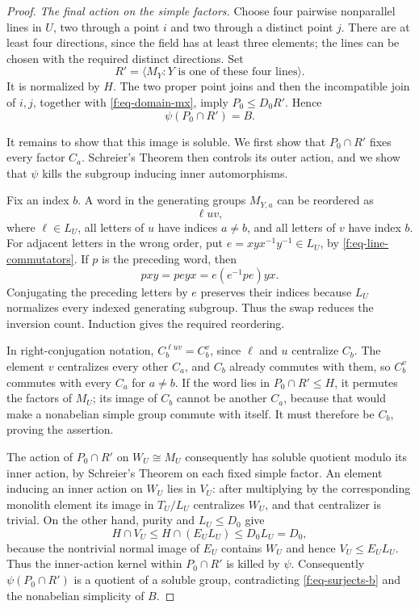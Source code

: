 \begin{proof}
\emph{The final action on the simple factors.}
Choose four pairwise nonparallel lines in $U$, two through a point $i$ and
two through a distinct point $j$. There are at least four directions,
since the field has at least three elements; the lines can be chosen
with the required distinct directions. Set
\[
 R'=\langle M_Y:Y\text{ is one of these four lines}\rangle.
\]
It is normalized by $H$. The two proper point joins and then the
incompatible join of $i,j$, together with \eqref{f:eq-domain-mx}, imply
$P_0\le D_0R'$. Hence
\begin{equation}\label{f:eq-surjects-b}
 \psi(P_0\cap R')=B.
\end{equation}

It remains to show that this image is soluble. We first show that
$P_0\cap R'$ fixes every factor $C_a$. Schreier's Theorem then controls
its outer action, and we show that $\psi$ kills the subgroup inducing
inner automorphisms.

Fix an index $b$.
A word in the generating groups $M_{Y,a}$ can be reordered as
\[
 \ell u v,
\]
where $\ell\in L_U$, all letters of $u$ have indices $a\ne b$, and all
letters of $v$ have index $b$. For adjacent letters in the wrong order,
put $e=xyx^{-1}y^{-1}\in L_U$, by
\eqref{f:eq-line-commutators}. If $p$ is the preceding word, then
\[
 pxy=peyx=e(e^{-1}pe)yx.
\]
Conjugating the preceding letters by $e$ preserves their indices because
$L_U$ normalizes every indexed generating subgroup. Thus the swap reduces
the inversion count. Induction gives the required reordering.

In right-conjugation notation, $C_b^{\ell u v}=C_b^v$, since $\ell$ and $u$
centralize $C_b$. The element $v$ centralizes every other $C_a$, and $C_b$
already commutes with them, so $C_b^v$ commutes with every $C_a$ for
$a\ne b$. If the word lies in $P_0\cap R'\le H$, it permutes the factors
of $M_U$; its image of $C_b$ cannot be another $C_a$, because that would
make a nonabelian simple group commute with itself. It must therefore be
$C_b$, proving the assertion.

The action of $P_0\cap R'$ on $W_U\cong M_U$ consequently has soluble
quotient modulo its inner action, by Schreier's Theorem on each fixed
simple factor. An element inducing an inner action on $W_U$ lies in
$V_U$: after multiplying by the corresponding monolith element its image
in $T_U/L_U$ centralizes $W_U$, and that centralizer is trivial. On the
other hand, purity and $L_U\le D_0$ give
\[
 H\cap V_U\le H\cap(E_UL_U)\le D_0L_U=D_0,
\]
because the nontrivial normal image of $E_U$ contains $W_U$ and hence
$V_U\le E_UL_U$. Thus the inner-action kernel within $P_0\cap R'$ is
killed by $\psi$. Consequently $\psi(P_0\cap R')$ is a quotient of a soluble group,
contradicting \eqref{f:eq-surjects-b} and the nonabelian simplicity of $B$.
\end{proof}

